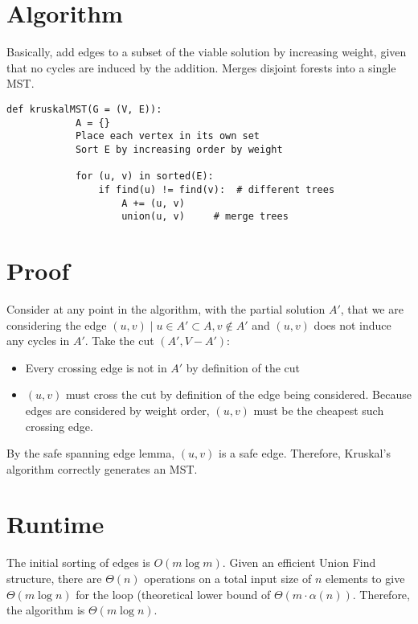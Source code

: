 \documentclass[11pt]{article}
\begin{document}
\section{Algorithm}
	Basically, add edges to a subset of the viable solution by increasing weight, given that no cycles are induced by the addition. Merges disjoint forests into a single MST.
	
	\begin{lstlisting}[autogobble=true]
		def kruskalMST(G = (V, E)):
			A = {}
			Place each vertex in its own set
			Sort E by increasing order by weight
			
			for (u, v) in sorted(E):
				if find(u) != find(v):	# different trees
					A += (u, v)
					union(u, v)		# merge trees
	\end{lstlisting}

\section{Proof}
	Consider at any point in the algorithm, with the partial solution $A'$, that we are considering the edge $(u, v) \mid u \in A' \subset A, v \notin A'$ and $(u, v)$ does not induce any cycles in $A'$. Take the cut $(A', V - A')$:
	\begin{itemize}
		\item Every crossing edge is not in $A'$ by definition of the cut
		\item $(u, v)$ must cross the cut by definition of the edge being considered. Because edges are considered by weight order, $(u, v)$ must be the cheapest such crossing edge.
	\end{itemize}
	By the safe spanning edge lemma, $(u, v)$ is a safe edge. Therefore, Kruskal's algorithm correctly generates an MST.
	
\section{Runtime}
	The initial sorting of edges is $O(m \log m)$. Given an efficient Union Find structure, there are $\Theta(n)$ operations on a total input size of $n$ elements to give $\Theta(m \log n)$ for the loop (theoretical lower bound of $\Theta(m \cdot \alpha(n))$. Therefore, the algorithm is $\Theta(m \log n)$.

%		
%		


\end{document}
